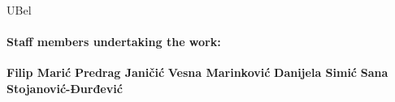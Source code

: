 \begin{sitedescription}{UBel}
\paragraph{Staff members undertaking the work:}

\textbf{Filip Marić}
\textbf{Predrag Janičić}
\textbf{Vesna Marinković}
\textbf{Danijela Simić}
\textbf{Sana Stojanović-Đurđević}


\end{sitedescription}

